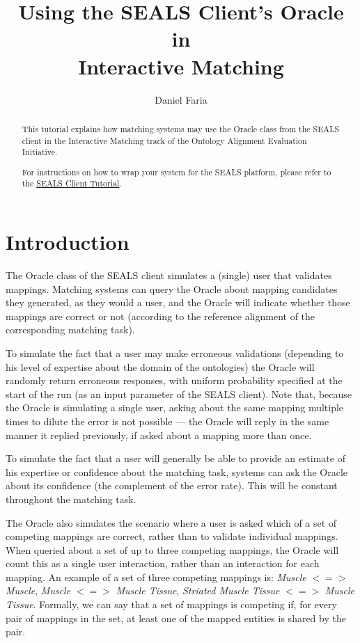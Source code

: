 \documentclass{article}
\begin{document}
\title{Using the SEALS Client's Oracle in\\Interactive Matching}

\author{Daniel Faria}

\maketitle

\begin{abstract}
This tutorial explains how matching systems may use the Oracle class from the SEALS client in the Interactive Matching track of the Ontology Alignment Evaluation Initiative.

For instructions on how to wrap your system for the SEALS platform, please refer to the \href{https://github.com/DanFaria/OAEI_SealsClient/blob/master/SealsClientTutorial.pdf}{SEALS Client Tutorial}.
\end{abstract}


\section{Introduction}
\label{sec:intro}

The Oracle class of the SEALS client simulates a (single) user that validates mappings. Matching systems can query the Oracle about mapping candidates they generated, as they would a user, and the Oracle will indicate whether those mappings are correct or not (according to the reference alignment of the corresponding matching task).

To simulate the fact that a user may make erroneous validations (depending to his level of expertise about the domain of the ontologies) the Oracle will randomly return erroneous responses, with uniform probability specified at the start of the run (as an input parameter of the SEALS client). Note that, because the Oracle is simulating a single user, asking about the same mapping multiple times to dilute the error is not possible --- the Oracle will reply in the same manner it replied previously, if asked about a mapping more than once. 

To simulate the fact that a user will generally be able to provide an estimate of his expertise or confidence about the matching task, systems can ask the Oracle about its confidence (the complement of the error rate). This will be constant throughout the matching task.

The Oracle also simulates the scenario where a user is asked which of a set of competing mappings are correct, rather than to validate individual mappings. When queried about a set of up to three competing mappings, the Oracle will count this as a single user interaction, rather than an interaction for each mapping. An example of a set of three competing mappings is: \textit{Muscle} \(<=>\) \textit{Muscle}, \textit{Muscle} \(<=>\) \textit{Muscle Tissue}, \textit{Striated Muscle Tissue} \(<=>\) \textit{Muscle Tissue}. Formally, we can say that a set of mappings is competing if, for every pair of mappings in the set, at least one of the mapped entities is shared by the pair.
\end{document}
